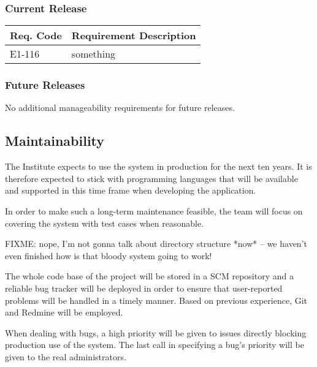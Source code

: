 \documentclass[12pt]{article}
\begin{document}
\subsubsection{Current Release}

\begin{table}[!h]
	\begin{tabular}{| l | l |}
		\hline
		\textbf{Req. Code} & \textbf{Requirement Description}\\
		\hline
		E1-116	& something\\
		\hline
	\end{tabular}
	\label{tab:UsabilityRequirements}
\end{table}

\subsubsection{Future Releases}
No additional manageability requirements for future releases.


\subsection{Maintainability}

The Institute expects to use the system in production for the next ten years.
It is therefore expected to stick with programming languages that will be
available and supported in this time frame when developing the application.

In order to make such a long-term maintenance feasible, the team will focus on
covering the system with test cases when reasonable.

FIXME: nope, I'm not gonna talk about directory structure *now* -- we haven't
even finished how is that bloody system going to work!

The whole code base of the project will be stored in a SCM repository and a
reliable bug tracker will be deployed in order to ensure that user-reported
problems will be handled in a timely manner.  Based on previous experience, Git
and Redmine will be employed.

When dealing with bugs, a high priority will be given to issues directly
blocking production use of the system.  The last call in specifying a bug's
priority will be given to the real administrators.
\end{document}
